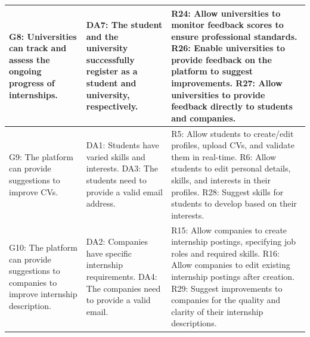 \begin{longtable}{| p{} | p{} | p{} |}
    G8: Universities can track and assess the ongoing progress of internships. & DA7: The student and the university successfully register as a student and university, respectively. & R24: Allow universities to monitor feedback scores to ensure professional standards. \newline R26: Enable universities to provide feedback on the platform to suggest improvements. \newline R27: Allow universities to provide feedback directly to students and companies. \\ \hline

    G9: The platform can provide suggestions to improve CVs. & DA1: Students have varied skills and interests. \newline DA3: The students need to provide a valid email address. & R5: Allow students to create/edit profiles, upload CVs, and validate them in real-time. \newline R6: Allow students to edit personal details, skills, and interests in their profiles. \newline R28: Suggest skills for students to develop based on their interests. \\ \hline

    G10: The platform can provide suggestions to companies to improve internship description. & DA2: Companies have specific internship requirements. \newline DA4: The companies need to provide a valid email. & R15: Allow companies to create internship postings, specifying job roles and required skills. \newline R16: Allow companies to edit existing internship postings after creation. \newline R29: Suggest improvements to companies for the quality and clarity of their internship descriptions. \\ \hline

\end{longtable}


